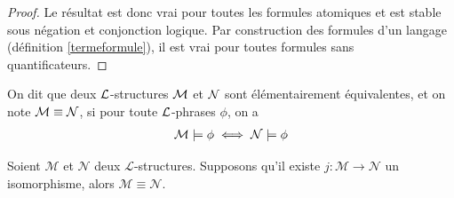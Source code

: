 \begin{proof}
\noindent Le résultat est donc vrai pour toutes les formules atomiques et est stable sous négation et conjonction logique.
Par construction des formules d'un langage (définition \ref{termeformule}), il est vrai pour toutes formules sans quantificateurs.
\end{proof}

\begin{defi}
On dit que deux $\mathcal{L}$-structures $\mathcal{M}$ et $\mathcal{N}$ sont élémentairement équivalentes, et on note $\mathcal{M} \equiv \mathcal{N}$, si
pour toute $\mathcal{L}$-phrases $\phi$, on a
\begin{align*}
\mathcal{M} \models \phi \iff \mathcal{N} \models \phi
\end{align*}
\end{defi}

\begin{theo}\label{isomorphisme}
Soient $\mathcal{M}$ et $\mathcal{N}$ deux $\mathcal{L}$-structures. Supposons qu'il existe $j: \mathcal{M} \rightarrow \mathcal{N}$ un isomorphisme,
alors $\mathcal{M} \equiv \mathcal{N}$.
\end{theo}

